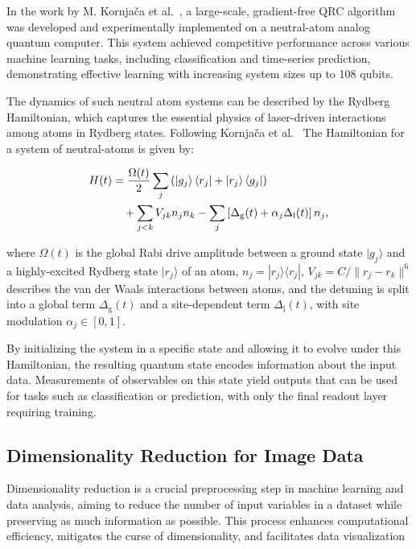 \documentclass[conference]{IEEEtran}
\begin{document}
In the work by M. Kornjača et al.~\cite{kornjavcaLargescaleQuantumReservoir2024}, 
a large-scale, gradient-free QRC algorithm was 
developed and experimentally implemented on a 
neutral-atom analog quantum computer. 
This system achieved competitive performance across 
various machine learning tasks, 
including classification and time-series prediction, 
demonstrating effective learning with increasing system 
sizes up to 108 qubits.

The dynamics of such neutral atom systems can be 
described by the Rydberg Hamiltonian, which captures 
the essential physics of laser-driven interactions 
among atoms in Rydberg states. Following Kornjača et al.~\cite{kornjavcaLargescaleQuantumReservoir2024}
The Hamiltonian for a system of neutral-atoms is given by:

\begin{equation}
    \begin{aligned}
        H(t) &= \dfrac{\Omega(t)}{2}\sum_j \left(\ket{g_j}\bra{r_j}+\ket{r_j}\bra{g_j}\right) \\
             &{{\quad}} + \sum_{j<k}V_{jk}n_jn_k - \sum_j \left[\Delta_{\mathrm{g}}(t) + \alpha_j\Delta_{\mathrm{l}}(t)\right] n_j,
    \end{aligned}
\end{equation}

where \( \Omega(t) \) is the global Rabi drive amplitude between a 
ground state \( |g_j\rangle \) and a highly-excited Rydberg state 
\( |r_j\rangle \) of an atom,
\( n_j = |r_j\rangle \langle r_j| \), 
\( V_{jk} = C/\|r_j - r_k\|^6 \) describes the van der Waals interactions
between atoms, and the detuning is split into a global term 
\( \Delta_{\mathrm{g}}(t) \)
and a site-dependent term \( \Delta_{\mathrm{l}}(t) \), with site 
modulation \( \alpha_j \in [0, 1] \).

By initializing the system in a specific state and allowing 
it to evolve under this Hamiltonian, the resulting quantum 
state encodes information about the input data. Measurements 
of observables on this state yield outputs that can be used 
for tasks such as classification or prediction, with only the 
final readout layer requiring training.


\subsection{Dimensionality Reduction for Image Data}
Dimensionality reduction is a crucial preprocessing step in 
machine learning and data analysis, aiming to reduce the 
number of input variables in a dataset while preserving as 
much information as possible. This process enhances 
computational efficiency, mitigates the curse of 
dimensionality, and facilitates data visualization
\end{document}

